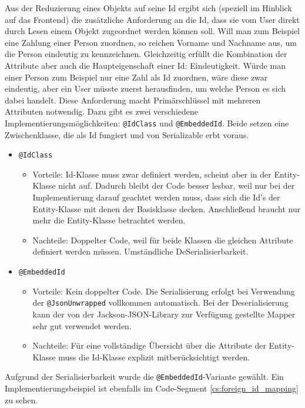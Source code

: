 
Aus der Reduzierung eines Objekts auf seine Id ergibt sich (speziell im Hinblick auf das Frontend) die zusätzliche Anforderung an die Id, dass sie vom User direkt durch Lesen einem Objekt zugeordnet werden können soll. Will man zum Beispiel eine Zahlung einer Person zuordnen, so reichen Vorname und Nachname aus, um die Person eindeutig zu kennzeichnen. Gleichzeitig erfüllt die Kombination der Attribute aber auch die Haupteigenschaft einer Id: Eindeutigkeit. Würde man einer Person zum Beispiel nur eine Zahl als Id zuordnen, wäre diese zwar eindeutig, aber ein User müsste zuerst herausfinden, um welche Person es sich dabei handelt. Diese Anforderung macht Primärschlüssel mit mehreren Attributen notwendig. Dazu gibt es zwei verschiedene Implementierungsmöglichkeiten: \verb|@IdClass| und \verb|@EmbeddedId|. Beide setzen eine Zwischenklasse, die als Id fungiert und von Serializable erbt voraus. 

\begin{itemize}
	\item \verb|@IdClass|
	\begin{itemize}
		\item Vorteile: Id-Klasse muss zwar definiert werden, scheint aber in der Entity-Klasse nicht auf. Dadurch bleibt der Code besser lesbar, weil nur bei der Implementierung darauf geachtet werden muss, dass sich die Id's der Entity-Klasse mit denen der Basisklasse decken. Anschließend braucht nur mehr die Entity-Klasse betrachtet werden.
		\item Nachteile: Doppelter Code, weil für beide Klassen die gleichen Attribute definiert werden müssen. Umständliche DeSerialisierbarkeit.
	\end{itemize}	
	\item \verb|@EmbeddedId|
	\begin{itemize}
		\item Vorteile: Kein doppelter Code. Die Serialisierung erfolgt bei Verwendung der \verb|@JsonUnwrapped| vollkommen automatisch. Bei der Deserialisierung kann der von der Jackson-JSON-Library zur Verfügung gestellte Mapper sehr gut verwendet werden. 
		\item Nachteile: Für eine vollständige Übersicht über die Attribute der Entity-Klasse muss die Id-Klasse explizit mitberücksichtigt werden.
	\end{itemize}
\end{itemize}

Aufgrund der Serialisierbarkeit wurde die \verb|@EmbeddedId|-Variante gewählt. Ein Implementierungsbeispiel ist ebenfalls im Code-Segment \ref{cs:foreign_id_mapping} zu sehen.

